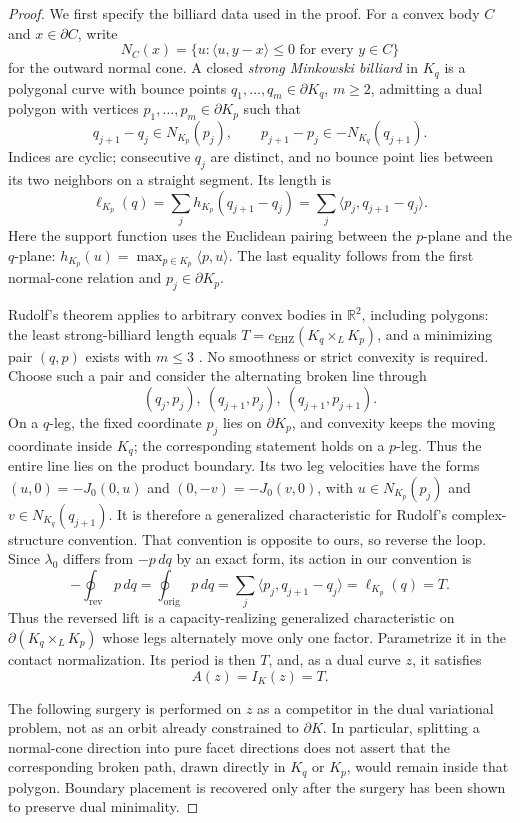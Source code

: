 \begin{proof}
We first specify the billiard data used in the proof. For a convex body
\(C\) and \(x\in\partial C\), write
\[
  N_C(x)=\{u:\langle u,y-x\rangle\leq0\text{ for every }y\in C\}
\]
for the outward normal cone. A closed \emph{strong Minkowski billiard}
in \(K_q\) is a polygonal curve with bounce points
\(q_1,\ldots,q_m\in\partial K_q\), \(m\geq2\), admitting a dual polygon
with vertices \(p_1,\ldots,p_m\in\partial K_p\) such that
\[
  q_{j+1}-q_j\in N_{K_p}(p_j),
  \qquad
  p_{j+1}-p_j\in-N_{K_q}(q_{j+1}).
\]
Indices are cyclic; consecutive \(q_j\) are distinct, and no bounce point
lies between its two neighbors on a straight segment. Its length is
\[
  \ell_{K_p}(q)
  =\sum_j h_{K_p}(q_{j+1}-q_j)
  =\sum_j\langle p_j,q_{j+1}-q_j\rangle.
\]
Here the support function uses the Euclidean pairing between the \(p\)-plane
and the \(q\)-plane: \(h_{K_p}(u)=\max_{p\in K_p}\langle p,u\rangle\).
The last equality follows from the first normal-cone relation and
\(p_j\in\partial K_p\).

Rudolf's theorem applies to arbitrary convex bodies in \(\mathbb R^2\),
including polygons: the least strong-billiard length equals
\(T=c_{\mathrm{EHZ}}(K_q\times_LK_p)\), and a minimizing pair \((q,p)\)
exists with \(m\leq3\) \cite[Definition~2 and Theorem~1]{Rudolf2022}.
No smoothness or strict convexity is required. Choose such a pair and
consider the alternating broken line through
\[
  (q_j,p_j),\ (q_{j+1},p_j),\ (q_{j+1},p_{j+1}).
\]
On a \(q\)-leg, the fixed coordinate \(p_j\) lies on \(\partial K_p\),
and convexity keeps the moving coordinate inside \(K_q\); the corresponding
statement holds on a \(p\)-leg. Thus the entire line lies on the product
boundary. Its two leg velocities have the forms
\((u,0)=-J_0(0,u)\) and \((0,-v)=-J_0(v,0)\), with
\(u\in N_{K_p}(p_j)\) and \(v\in N_{K_q}(q_{j+1})\).
It is therefore a generalized characteristic for Rudolf's complex-structure convention.
That convention is opposite to ours, so reverse the loop. Since \(\lambda_0\)
differs from \(-p\,dq\) by an exact form, its action in our convention is
\[
  -\oint_{\mathrm{rev}}p\,dq
  =\oint_{\mathrm{orig}}p\,dq
  =\sum_j\langle p_j,q_{j+1}-q_j\rangle
  =\ell_{K_p}(q)=T.
\]
Thus the reversed lift is a capacity-realizing generalized characteristic on
\(\partial(K_q\times_L K_p)\) whose legs alternately move only one factor.
Parametrize it in the contact normalization. Its period is then \(T\), and, as
a dual curve \(z\), it satisfies
\[
  A(z)=I_K(z)=T.
\]

The following surgery is performed on \(z\) as a competitor in the dual
variational problem, not as an orbit already constrained to \(\partial K\).
In particular, splitting a normal-cone direction into pure facet directions
does not assert that the corresponding broken path, drawn directly in
\(K_q\) or \(K_p\), would remain inside that polygon.  Boundary placement is
recovered only after the surgery has been shown to preserve dual minimality.


\end{proof}
